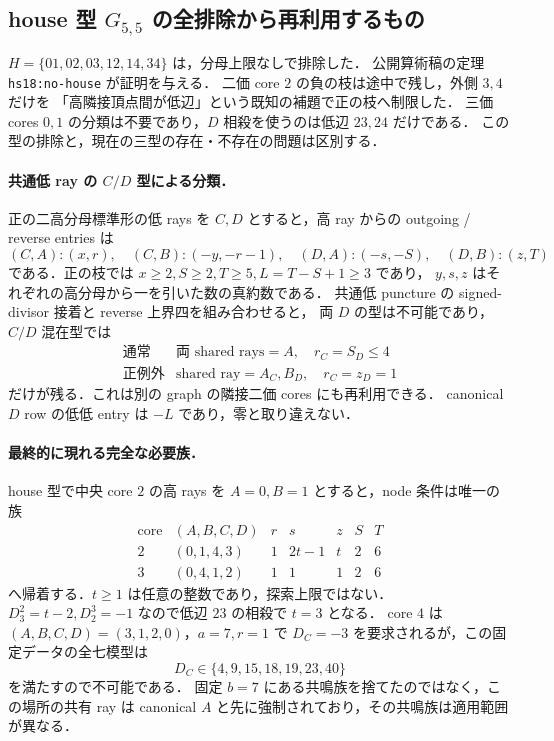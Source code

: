 \subsection{house 型 \texorpdfstring{$G_{5,5}$}{G5,5} の全排除から再利用するもの}
\label{nh18:house}

$H=\{01,02,03,12,14,34\}$ は，分母上限なしで排除した．
公開算術稿の定理 \texttt{hs18:no-house} が証明を与える．
二価 core $2$ の負の枝は途中で残し，外側 $3,4$ だけを
「高隣接頂点間が低辺」という既知の補題で正の枝へ制限した．
三価 cores $0,1$ の分類は不要であり，$D$ 相殺を使うのは低辺 $23,24$ だけである．
この型の排除と，現在の三型の存在・不存在の問題は区別する．

\paragraph{共通低 ray の $C/D$ 型による分類．}
正の二高分母標準形の低 rays を $C,D$ とすると，高 ray からの
outgoing / reverse entries は
\[
 (C,A):(x,r),\quad(C,B):(-y,-r-1),\quad
 (D,A):(-s,-S),\quad(D,B):(z,T)
\]
である．正の枝では $x\ge2,S\ge2,T\ge5,L=T-S+1\ge3$ であり，
$y,s,z$ はそれぞれの高分母から一を引いた数の真約数である．
共通低 puncture の signed-divisor 接着と reverse 上界四を組み合わせると，
両 $D$ の型は不可能であり，$C/D$ 混在型では
\[
 \begin{array}{c|c}
 \text{通常}&\text{両 shared rays}=A,\quad r_C=S_D\le4\\
 \text{正例外}&\text{shared ray}=A_C,B_D,\quad r_C=z_D=1
 \end{array}
\]
だけが残る．これは別の graph の隣接二価 cores にも再利用できる．
canonical $D$ row の低低 entry は $-L$ であり，零と取り違えない．

\paragraph{最終的に現れる完全な必要族．}
house 型で中央 core $2$ の高 rays を $A=0,B=1$ とすると，node 条件は唯一の族
\[
 \begin{array}{c|c|ccccc}
 \text{core}&(A,B,C,D)&r&s&z&S&T\\\hline
 2&(0,1,4,3)&1&2t-1&t&2&6\\
 3&(0,4,1,2)&1&1&1&2&6
 \end{array}
\]
へ帰着する．$t\ge1$ は任意の整数であり，探索上限ではない．
$D^2_3=t-2,D^3_2=-1$ なので低辺 $23$ の相殺で $t=3$ となる．
core $4$ は $(A,B,C,D)=(3,1,2,0)$，$a=7,r=1$ で
$D_C=-3$ を要求されるが，この固定データの全七模型は
\[
 D_C\in\{4,9,15,18,19,23,40\}
\]
を満たすので不可能である．
固定 $b=7$ にある共鳴族を捨てたのではなく，この場所の共有 ray は
canonical $A$ と先に強制されており，その共鳴族は適用範囲が異なる．

